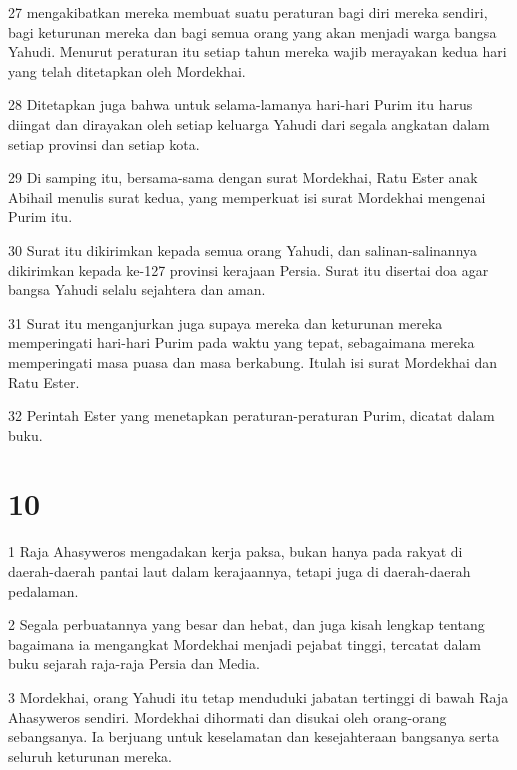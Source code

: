 \par 27 mengakibatkan mereka membuat suatu peraturan bagi diri mereka sendiri, bagi keturunan mereka dan bagi semua orang yang akan menjadi warga bangsa Yahudi. Menurut peraturan itu setiap tahun mereka wajib merayakan kedua hari yang telah ditetapkan oleh Mordekhai.
\par 28 Ditetapkan juga bahwa untuk selama-lamanya hari-hari Purim itu harus diingat dan dirayakan oleh setiap keluarga Yahudi dari segala angkatan dalam setiap provinsi dan setiap kota.
\par 29 Di samping itu, bersama-sama dengan surat Mordekhai, Ratu Ester anak Abihail menulis surat kedua, yang memperkuat isi surat Mordekhai mengenai Purim itu.
\par 30 Surat itu dikirimkan kepada semua orang Yahudi, dan salinan-salinannya dikirimkan kepada ke-127 provinsi kerajaan Persia. Surat itu disertai doa agar bangsa Yahudi selalu sejahtera dan aman.
\par 31 Surat itu menganjurkan juga supaya mereka dan keturunan mereka memperingati hari-hari Purim pada waktu yang tepat, sebagaimana mereka memperingati masa puasa dan masa berkabung. Itulah isi surat Mordekhai dan Ratu Ester.
\par 32 Perintah Ester yang menetapkan peraturan-peraturan Purim, dicatat dalam buku.

\chapter{10}

\par 1 Raja Ahasyweros mengadakan kerja paksa, bukan hanya pada rakyat di daerah-daerah pantai laut dalam kerajaannya, tetapi juga di daerah-daerah pedalaman.
\par 2 Segala perbuatannya yang besar dan hebat, dan juga kisah lengkap tentang bagaimana ia mengangkat Mordekhai menjadi pejabat tinggi, tercatat dalam buku sejarah raja-raja Persia dan Media.
\par 3 Mordekhai, orang Yahudi itu tetap menduduki jabatan tertinggi di bawah Raja Ahasyweros sendiri. Mordekhai dihormati dan disukai oleh orang-orang sebangsanya. Ia berjuang untuk keselamatan dan kesejahteraan bangsanya serta seluruh keturunan mereka.


